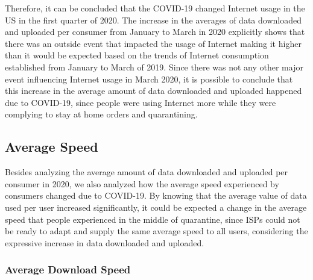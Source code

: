 \documentclass[conference,10pt]{IEEEtran}
\begin{document}
Therefore, it can be concluded that the COVID-19 changed Internet usage in the US in the first quarter of 2020. The increase in the averages of data downloaded and uploaded per consumer from January to March in 2020 explicitly shows that there was an outside event that impacted the usage of Internet making it higher than it would be expected based on the trends of Internet consumption established from January to March of 2019. Since there was not any other major event influencing  Internet usage in March 2020, it is possible to conclude that this increase in the average amount of data downloaded and uploaded happened due to COVID-19, since people were using Internet more while they were complying to stay at home orders and quarantining.

\subsection{Average Speed}



\label{sec:average-speed}
Besides analyzing the average amount of data downloaded and uploaded per consumer in 2020, we also analyzed how the average speed experienced by consumers changed due to COVID-19. By knowing that the average value of data used per user increased significantly, it could be expected a change in the average speed that people experienced in the middle of quarantine, since ISPs could not be ready to adapt and supply the same average speed to all users, considering the expressive increase in data downloaded and uploaded.

\subsubsection{Average Download Speed}
\label{sec:average-download-speed}
\end{document}
